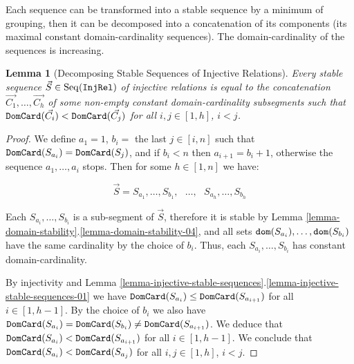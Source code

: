 \documentclass{lmcs}
\newtheorem{lemma}[theorem]{Lemma}
\begin{document}
Each sequence can be transformed into a stable sequence by a minimum of grouping,
then it can be decomposed into a concatenation of its components (its maximal
constant domain-cardinality sequences). The domain-cardinality of the sequences
is increasing.


\begin{lemma}[Decomposing Stable Sequences of Injective Relations]
\label{lemma-decomposition-stable}
Every stable sequence $\vec{S} \in {\rm Seq}({\tt InjRel})$ of injective relations is equal to the 
concatenation $\vec{C_1}, \ldots, \vec{C_h}$
of some non-empty constant domain-cardinality subsegments 
such that ${\tt DomCard}(\vec{C_i})  < {\tt DomCard}(\vec{C_j})$ for all $i,j \in [1,h]$, $i < j$.
\end{lemma}


\begin{proof}
We define $a_1=1$, $b_i = $ the last $j \in [i,n]$ such that 
${\tt DomCard}(S_{a_i}) = {\tt DomCard}(S_j)$, and if $b_i<n$ then $a_{i+1}=b_i + 1$,
otherwise the sequence $a_1, \ldots, a_i$ stops.
Then for some $h \in [1,n]$ we have:

$$
\vec{S}
=
S_{a_1},\ldots,S_{b_1}, \ \ \   
\ldots, \ \ \   
S_{a_{h}},\ldots,S_{b_{h}}
$$

Each $S_{a_{i}},\ldots,S_{b_{i}}$ is a sub-segment of $\vec{S}$, therefore it is stable
by Lemma \ref{lemma-domain-stability}.\ref{lemma-domain-stability-04}, 
and all sets ${\tt dom}(S_{a_{i}}), \ldots, {\tt dom}(S_{b_{i}})$ have the same cardinality 
by the choice of $b_i$. 
Thus, each $S_{a_{i}},\ldots,S_{b_{i}}$ has constant domain-cardinality. 

By injectivity and
Lemma \ref{lemma-injective-stable-sequences}.\ref{lemma-injective-stable-sequences-01}
we have ${\tt DomCard}(S_{a_i}) \le {\tt DomCard}(S_{a_{i+1}})$ for all $i \in [1,h-1]$.
By the choice of $b_i$ we also have 
${\tt DomCard}(S_{a_{i}}) = {\tt DomCard}(S_{b_{i}}) \not = {\tt DomCard}(S_{a_{i+1}})$.
We deduce that
${\tt DomCard}(S_{a_i}) <  {\tt DomCard}(S_{a_{i+1}})$ for all $i \in [1,h-1]$.
We conclude  that
${\tt DomCard}(S_{a_i}) <  {\tt DomCard}(S_{a_{j}})$ for all $i,j \in [1,h]$, $i < j$.

\end{proof}
\end{document}
